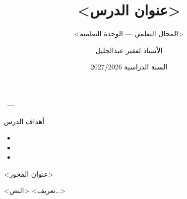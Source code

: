 \documentclass[aspectratio=169, 11pt]{beamer}
\title{<عنوان الدرس>}
\subtitle{<المجال التعلمي — الوحدة التعلمية>}
\author{الأستاذ لفقير عبدالجليل}
\institute{ثانوية الشهيد حكومي العيد أدرار}
\date{السنة الدراسية 2027/2026}
\begin{document}
\begin{frame}[plain]
  \officialheader
  \vfill
  \begin{center}
    {\color{primary}\Huge\bfseries\inserttitle}
  \end{center}
  \vfill
  \begin{center}
    {\color{rulegray}\footnotesize \insertauthor\ — \insertdate}
  \end{center}
\end{frame}

\begin{frame}{أهداف الدرس}
  \begin{itemize}
    \item <الهدف 1>
    \item <الهدف 2>
    \item <الهدف 3>
  \end{itemize}
\end{frame}


\begin{frame}{<عنوان المحور>}
  \begin{block}{<تعريف>}
    <النص…>
  \end{block}
\end{frame}
\end{document}
